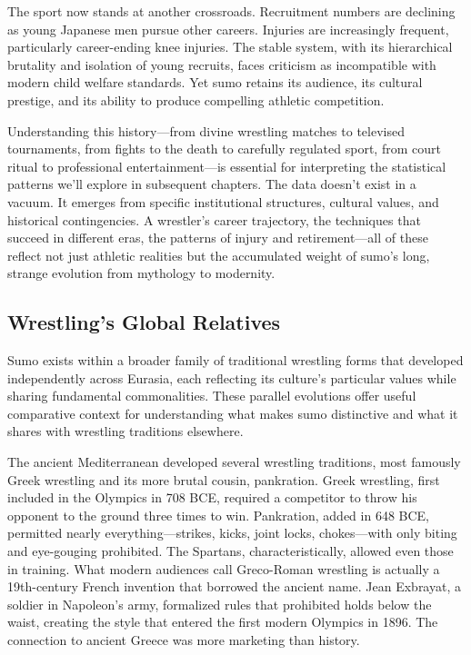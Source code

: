 The sport now stands at another crossroads. Recruitment numbers are declining as young Japanese men pursue other careers. Injuries are increasingly frequent, particularly career-ending knee injuries. The stable system, with its hierarchical brutality and isolation of young recruits, faces criticism as incompatible with modern child welfare standards. Yet sumo retains its audience, its cultural prestige, and its ability to produce compelling athletic competition.

Understanding this history—from divine wrestling matches to televised tournaments, from fights to the death to carefully regulated sport, from court ritual to professional entertainment—is essential for interpreting the statistical patterns we'll explore in subsequent chapters. The data doesn't exist in a vacuum. It emerges from specific institutional structures, cultural values, and historical contingencies. A wrestler's career trajectory, the techniques that succeed in different eras, the patterns of injury and retirement—all of these reflect not just athletic realities but the accumulated weight of sumo's long, strange evolution from mythology to modernity.

\subsection{Wrestling's Global Relatives}

Sumo exists within a broader family of traditional wrestling forms that developed independently across Eurasia, each reflecting its culture's particular values while sharing fundamental commonalities. These parallel evolutions offer useful comparative context for understanding what makes sumo distinctive and what it shares with wrestling traditions elsewhere.

The ancient Mediterranean developed several wrestling traditions, most famously Greek wrestling and its more brutal cousin, pankration. Greek wrestling, first included in the Olympics in 708 BCE, required a competitor to throw his opponent to the ground three times to win. Pankration, added in 648 BCE, permitted nearly everything—strikes, kicks, joint locks, chokes—with only biting and eye-gouging prohibited. The Spartans, characteristically, allowed even those in training. What modern audiences call Greco-Roman wrestling is actually a 19th-century French invention that borrowed the ancient name. Jean Exbrayat, a soldier in Napoleon's army, formalized rules that prohibited holds below the waist, creating the style that entered the first modern Olympics in 1896. The connection to ancient Greece was more marketing than history.

